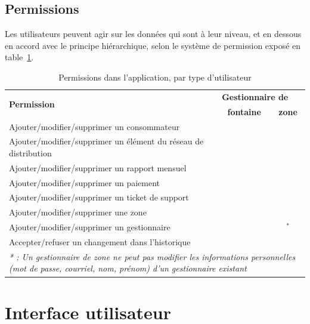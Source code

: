 \documentclass{EPL-master-thesis-covers-FR}
\newcommand{\cmark}{\ding{51}}%
\newcommand{\xmark}{\ding{55}}%
\begin{document}
			\subsection*{Permissions}

				Les utilisateurs peuvent agir sur les données qui sont à leur niveau, et en dessous en accord avec le principe hiérarchique, selon le système de permission exposé en table~\ref{tab:permissions}.
				\begin{table}[H]
					\centering
					\small
					\setlength\tabcolsep{2pt}
					\begin{tabular}{|l|c|c|}
						\hline
						\multirow{2}{*}{\textbf{Permission}} & \multicolumn{2}{l|}{\textbf{Gestionnaire de}} \\ \cline{2-3}
						 & \textbf{fontaine} & \textbf{zone} \\ \hline
						 Ajouter/modifier/supprimer un consommateur & \cmark & \cmark \\ \hline
						 Ajouter/modifier/supprimer un élément du réseau de distribution & \cmark & \cmark \\ \hline
						 Ajouter/modifier/supprimer un rapport mensuel & \cmark & \cmark \\ \hline
						 Ajouter/modifier/supprimer un paiement & \cmark & \cmark \\ \hline
						 Ajouter/modifier/supprimer un ticket de support & \cmark & \cmark \\ \hline
						 Ajouter/modifier/supprimer une zone & \xmark & \cmark \\ \hline
						 Ajouter/modifier/supprimer un gestionnaire & \xmark & \cmark$^{*}$ \\ \hline
						 Accepter/refuser un changement dans l'historique & \xmark & \cmark \\ \hline
						 \multicolumn{3}{p{\textwidth}}{\emph{* : Un gestionnaire de zone ne peut pas modifier les informations personnelles (mot de passe, courriel, nom, prénom) d'un gestionnaire existant}} \\
					\end{tabular}
					\caption{Permissions dans l'application, par type d'utilisateur}
					\label{tab:permissions}
				\end{table}

		\section{Interface utilisateur}
\end{document}
